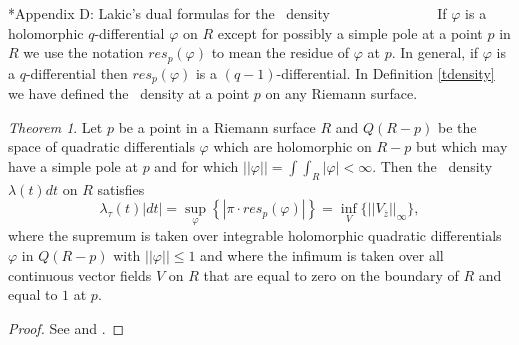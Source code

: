 \documentclass[12pt]{amsart}
\theoremstyle{remark}
\newtheorem{theorem}{Theorem}
\theoremstyle{definition}
\theoremstyle{definition}
\begin{document}
\begin{section}*{Appendix D: Lakic's dual formulas for the \te\ density \ \ \ \ \ \ \ \ \ \ \ \ \ \ }
If $\varphi$ is a holomorphic $q$-differential  $\varphi$ on $R$ except for possibly a simple pole at a point
$p$ in $R$  we use the notation $res_p(\varphi)$ to mean the residue of $\varphi$ at $p.$
In general, if $\varphi$ is a $q$-differential then $res_p(\varphi)$ is a $(q-1)$-differential.  In Definition \ref{tdensity} we have defined the \te\ density at a point $p$ on any Riemann surface.

 \begin{theorem}\label{thm3} Let $p$ be a point in a Riemann surface  $R$ and $Q(R-p)$ be the 
 space of quadratic differentials $\varphi$  which are holomorphic on $R-p$ but which may have a 
 simple pole at $p$ and   for which $||\varphi|| = \int\!\!\int_{R} |\varphi| < \infty.$   Then the \te\ density 
 $\lambda(t)dt$ on $R$ satisfies
         $$\lambda_{\tau}(t)|dt| = \sup_{\varphi}
         \left\{|\pi \cdot res_p(\varphi)| \right\}
         = \inf_{V} \{||V_{\overline{z}}||_{\infty} \}, $$ 
         where the supremum is taken over integrable holomorphic quadratic differentials $\varphi$ in 
         $Q(R-p)$ with $||\varphi|| \leq 1$ and
        where the  infimum is taken over all continuous vector fields  $V$ on $R$ that are equal to zero on the boundary of $R$ and equal to $1$ at $p.$        
        \end{theorem}
 \begin{proof} See \cite{GardinerLakic1} and \cite{GardinerLakic3}.
 \end{proof}
\end{section}

\nocite{GardinerLakic1}
\nocite{GardinerLakic3}
\nocite{Ahlfors6}
\nocite{Krushkal2}
\nocite{Royden2}
\nocite{Kobayashibook}




\end{document}

